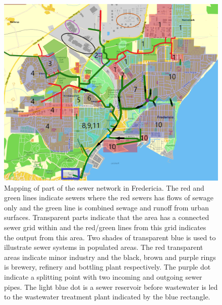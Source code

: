\begin{figure}[H]
\centering
\includegraphics[width=1\textwidth]{report/system_overview/pictures/kloakgrid_simplified8.png}
\caption{Mapping of part of the sewer network in Fredericia. The red and green lines indicate sewers where the red sewers has flows of sewage only and the green line is combined sewage and runoff from urban surfaces. Transparent parts indicate that the area has a connected sewer grid within and the red/green lines from this grid indicates the output from this area. Two shades of transparent blue is used to illustrate sewer systems in populated areas. The red transparent areas indicate minor industry and the black, brown and purple rings is brewery, refinery and bottling plant respectively. The purple dot indicate a splitting point with two incoming and outgoing sewer pipes. The light blue dot is a sewer reservoir before wastewater is led to the wastewater treatment plant indicated by the blue rectangle.}
\label{fig:kloakgrid_simplified}
\end{figure}


